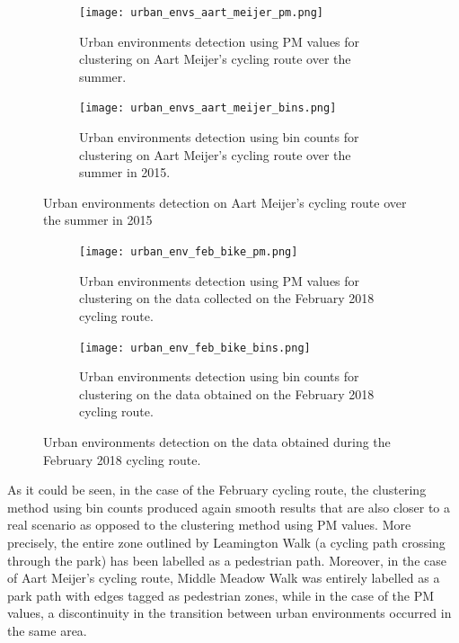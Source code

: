 \documentclass[bsc,frontabs,twoside,singlespacing, parskip,deptreport]{infthesis}     %
\begin{document}
\begin{figure}[h!]
  \begin{subfigure}[t]{0.5\textwidth}
    \texttt{[image: urban\_envs\_aart\_meijer\_pm.png]}
    \caption{Urban environments detection using PM values for clustering on Aart Meijer's cycling route over the summer.}
    \label{fig:meijer-bike-urban-envs-pm}
  \end{subfigure}
  \hfill
  \begin{subfigure}[t]{0.5\textwidth}
    \texttt{[image: urban\_envs\_aart\_meijer\_bins.png]}
    \caption{Urban environments detection using bin counts for clustering on Aart Meijer's cycling route over the summer in 2015.}
    \label{fig:meijer-bike-urban-envs-bins}
  \end{subfigure}
  \caption{Urban environments detection on Aart Meijer's cycling route over the summer in 2015}
  \label{fig:meijer-bike-urban-envs}
\end{figure}

\begin{figure}[h!]
  \begin{subfigure}[t]{\textwidth}
    \texttt{[image: urban\_env\_feb\_bike\_pm.png]}
    \caption{Urban environments detection using PM values for clustering on the data collected on the February 2018 cycling route.}
    \label{fig:feb-bike-urban-envs-pm}
  \end{subfigure}
  \hfill
  \begin{subfigure}[t]{\textwidth}
    \texttt{[image: urban\_env\_feb\_bike\_bins.png]}
    \caption{Urban environments detection using bin counts for clustering on the data obtained on the February 2018 cycling route.}
    \label{fig:feb-bike-urban-envs-bins}
  \end{subfigure}
  \caption{Urban environments detection on the data obtained during the February 2018 cycling route.}
  \label{fig:feb-bike-urban-envs}
\end{figure}

As it could be seen, in the case of the February cycling route, the clustering method using bin counts produced again smooth results that are also closer to a real scenario as opposed to the clustering method using PM values. More precisely, the entire zone outlined by Leamington Walk (a cycling path crossing through the park) has been labelled as a pedestrian path. Moreover, in the case of Aart Meijer's cycling route, Middle Meadow Walk was entirely labelled as a park path with edges tagged as pedestrian zones, while in the case of the PM values, a discontinuity in the transition between urban environments occurred in the same area.
\end{document}

